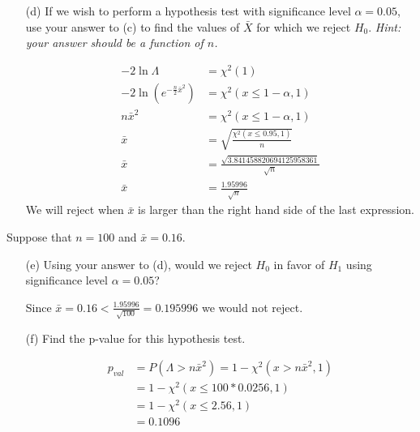 \documentclass{article}
\newcommand{\1}{\mathbf{1}}
\begin{document}
\begin{itemize}
    \newpage
    \item[(d)]  If we wish to perform a hypothesis test with significance level $\alpha = 0.05$, use your answer to (c) to find the values of $\bar{X}$ for which we reject $H_0$. {\it Hint: your answer should be a function of $n$.}
    
    \begin{align*}
    -2\ln{\Lambda} &= \chi^2(1) \\
    -2\ln{\left( e^{ -\frac{n}{2}\bar x^2 } \right)} &= \chi^2(x\leq 1-\alpha, 1) \\
    n\bar x^2 &= \chi^2(x\leq 1-\alpha, 1) \\
    \bar x &= \sqrt{\frac{\chi^2(x\leq 0.95, 1)}{n}} \\
    \bar x &= \frac{\sqrt{3.841458820694125958361}}{\sqrt{n}} \\
    \bar x &= \frac{1.95996}{\sqrt{n}}
    \end{align*}    
    We will reject when $\bar x$ is larger than the right hand side of the last expression.
\end{itemize}
Suppose that $n=100$ and $\bar{x}=0.16$. 
\begin{itemize}
    \item[(e)] Using your answer to (d), would we reject $H_0$ in favor of $H_1$ using significance level $\alpha=0.05$?
    
    Since $\bar x = 0.16 < \frac{1.95996}{\sqrt{100}} = 0.195996$ we would not reject.
    
    \item[(f)] Find the p-value for this hypothesis test.
    
    \begin{align*}
        p_{val} &= P(\Lambda > n\bar x^2) = 1 - \chi^2(x > n\bar x^2, 1) \\
        &= 1 - \chi^2(x \leq 100*0.0256, 1) \\
        &= 1 - \chi^2(x \leq 2.56, 1) \\
        &= 0.1096
    \end{align*}
\end{itemize}


\newpage
\end{document}
